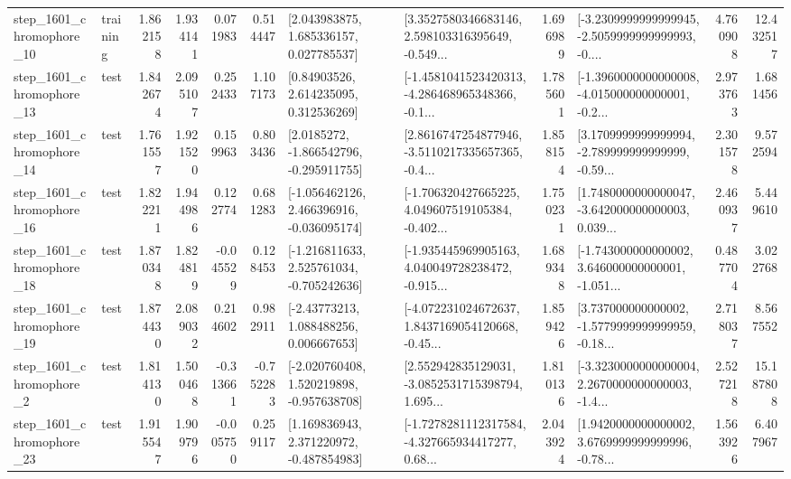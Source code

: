 \begin{tabular}{llrrrrllrlrr}
 step\_1601\_chromophore\_10 &  training &      1.862158 &    1.934141 &      0.071983 &  0.514447 &     [2.043983875, 1.685336157, 0.027785537] &  [3.3527580346683146, 2.598103316395649, -0.549... &       1.696989 &  [-3.2309999999999945, -2.5059999999999993, -0.... &            4.760908 &         12.432517 \\
 step\_1601\_chromophore\_13 &      test &      1.842674 &    2.095107 &      0.252433 &  1.107173 &      [0.84903526, 2.614235095, 0.312536269] &  [-1.4581041523420313, -4.286468965348366, -0.1... &       1.785601 &  [-1.3960000000000008, -4.015000000000001, -0.2... &            2.973763 &          1.681456 \\
 step\_1601\_chromophore\_14 &      test &      1.761557 &    1.921520 &      0.159963 &  0.803436 &     [2.0185272, -1.866542796, -0.295911755] &  [2.8616747254877946, -3.5110217335657365, -0.4... &       1.858154 &  [3.1709999999999994, -2.789999999999999, -0.59... &            2.301578 &          9.572594 \\
 step\_1601\_chromophore\_16 &      test &      1.822211 &    1.944986 &      0.122774 &  0.681283 &   [-1.056462126, 2.466396916, -0.036095174] &  [-1.706320427665225, 4.049607519105384, -0.402... &       1.750231 &  [1.7480000000000047, -3.642000000000003, 0.039... &            2.460937 &          5.449610 \\
 step\_1601\_chromophore\_18 &      test &      1.870348 &    1.824819 &     -0.045529 &  0.128453 &   [-1.216811633, 2.525761034, -0.705242636] &  [-1.935445969905163, 4.040049728238472, -0.915... &       1.689348 &  [-1.743000000000002, 3.646000000000001, -1.051... &            0.487704 &          3.022768 \\
 step\_1601\_chromophore\_19 &      test &      1.874430 &    2.089032 &      0.214602 &  0.982911 &     [-2.43773213, 1.088488256, 0.006667653] &  [-4.072231024672637, 1.8437169054120668, -0.45... &       1.859426 &  [3.737000000000002, -1.5779999999999959, -0.18... &            2.718037 &          8.567552 \\
  step\_1601\_chromophore\_2 &      test &      1.814130 &    1.500468 &     -0.313661 & -0.752283 &   [-2.020760408, 1.520219898, -0.957638708] &  [2.552942835129031, -3.0852531715398794, 1.695... &       1.810136 &  [-3.3230000000000004, 2.2670000000000003, -1.4... &            2.527218 &         15.187808 \\
 step\_1601\_chromophore\_23 &      test &      1.915547 &    1.909796 &     -0.005750 &  0.259117 &    [1.169836943, 2.371220972, -0.487854983] &  [-1.7278281112317584, -4.327665934417277, 0.68... &       2.043924 &  [1.9420000000000002, 3.6769999999999996, -0.78... &            1.563926 &          6.407967 \\

\end{tabular}
